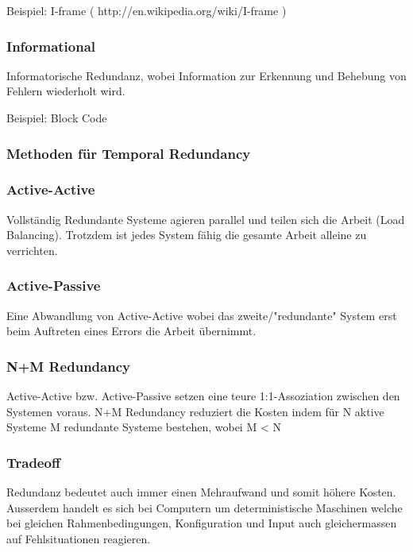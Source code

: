 Beispiel: I-frame ( http://en.wikipedia.org/wiki/I-frame )

\subsubsection*{Informational}

Informatorische Redundanz, wobei Information zur Erkennung und Behebung von Fehlern wiederholt wird.

Beispiel: Block Code

\subsubsection*{Methoden für Temporal Redundancy}


\subsubsection*{Active-Active}

Vollständig Redundante Systeme agieren parallel und teilen sich die Arbeit (Load Balancing). Trotzdem ist jedes System fähig die gesamte Arbeit alleine zu verrichten.

\subsubsection*{Active-Passive}

Eine Abwandlung von Active-Active wobei das zweite/"redundante" System erst beim Auftreten eines Errors die Arbeit übernimmt.

\subsubsection*{N+M Redundancy}

Active-Active bzw. Active-Passive setzen eine teure 1:1-Assoziation zwischen den Systemen voraus. N+M Redundancy reduziert die Kosten indem für N aktive Systeme M redundante Systeme bestehen, wobei M < N

\subsubsection*{Tradeoff}


Redundanz bedeutet auch immer einen Mehraufwand und somit höhere Kosten. Ausserdem handelt es sich bei Computern um deterministische Maschinen welche bei gleichen Rahmenbedingungen, Konfiguration und Input auch gleichermassen auf Fehlsituationen reagieren.

